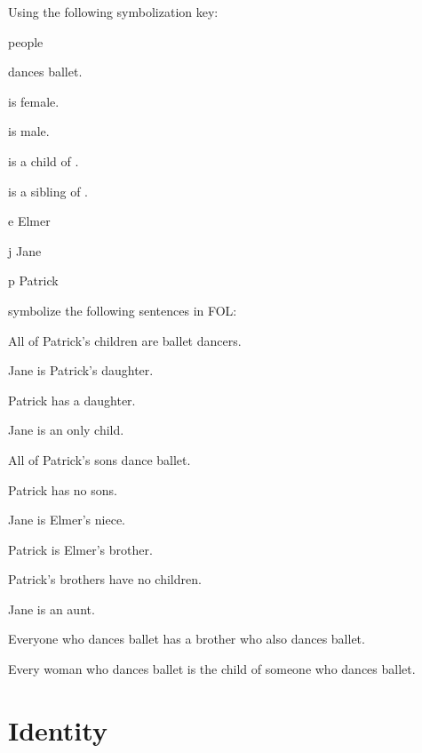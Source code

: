 \solutions
\problempart
\label{pr.FOLballet}
Using the following symbolization key:
\begin{ekey}
\item[\text{domain}] people
\item[\atom{D}{x}]  dances ballet.
\item[\atom{F}{x}]  is female.
\item[\atom{M}{x}]  is male.
\item[\atom{C}{x,y}]  is a child of .
\item[\atom{S}{x,y}]  is a sibling of .
\item[e] Elmer
\item[j] Jane
\item[p] Patrick
\end{ekey}
symbolize the following sentences in FOL:
\begin{earg}
\item All of Patrick's children are ballet dancers.
\item Jane is Patrick's daughter.
\item Patrick has a daughter.
\item Jane is an only child.
\item All of Patrick's sons dance ballet.
\item Patrick has no sons.
\item Jane is Elmer's niece.
\item Patrick is Elmer's brother.
\item Patrick's brothers have no children.
\item Jane is an aunt.
\item Everyone who dances ballet has a brother who also dances ballet.
\item Every woman who dances ballet is the child of someone who dances ballet.
\end{earg}


\chapter{Identity}
\label{sec.identity}

